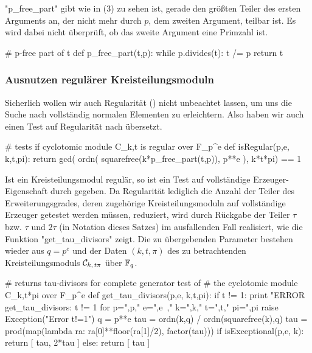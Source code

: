 "p_free_part" gibt wie in  (3) zu sehen ist,
gerade den größten Teiler des ersten Arguments an, der nicht mehr durch $p$,
dem zweiten Argument, teilbar ist. Es wird dabei nicht überprüft, ob das zweite
Argument eine Primzahl ist.


\begin{sagecode}[caption={Aus \url{../Sage/enumeratePCNs.spyx}}]
# p-free part of t
def p_free_part(t,p):
    while p.divides(t):
        t /= p
    return t
\end{sagecode}




\subsubsection{Ausnutzen regulärer Kreisteilungsmoduln}

Sicherlich wollen wir auch Regularität () nicht unbeachtet
lassen, um uns die Suche nach vollständig normalen Elementen zu erleichtern.
Also haben wir auch einen Test auf Regularität nach \sage übersetzt.

\begin{sagecode}[caption={Aus \url{../Sage/enumeratePCNs.spyx}}]
# tests if cyclotomic module C_k,t is regular over F_p^e
def isRegular(p,e, k,t,pi):
    return gcd( ordn( squarefree(k*p_free_part(t,p)), p**e ),  k*t*pi) == 1
\end{sagecode}

Ist ein Kreisteilungsmodul regulär, so ist ein Test auf vollständige
Erzeuger-Eigenschaft durch  gegeben.
Da Regularität lediglich die Anzahl der Teiler des Erweiterungsgrades, deren
zugehörige Kreisteilungsmoduln auf vollständige Erzeuger getestet werden
müssen, reduziert, wird  durch Rückgabe der
Teiler $\tau$ bzw. $\tau$ und $2\tau$ (in Notation dieses Satzes)
im ausfallenden Fall realisiert, wie die Funktion 
"get_tau_divisors" zeigt. Die zu übergebenden Parameter bestehen wieder aus 
$q = p^e$ und der Daten $(k,t,\pi)$ des zu betrachtenden Kreisteilungsmoduls 
$\mathcal{C}_{k,\,t\pi}$ über $\mathbb{F}_q$.

\begin{sagecode}[caption={Aus \url{../Sage/enumeratePCNs.spyx}}]
# returns tau-divisors for complete generator test of 
# the cyclotomic module C_k,t*pi over F_p^e
def get_tau_divisors(p,e, k,t,pi):
    if t != 1:
        print "ERROR get_tau_divisors: t != 1 for p=",p," e=",e\
                ," k=",k," t=",t," pi=",pi
        raise Exception("Error t!=1")
    q = p**e
    tau = ordn(k,q) / ordn(squarefree(k),q)
    tau = prod(map(lambda ra: ra[0]**floor(ra[1]/2), factor(tau)))
    if isExceptional(p,e, k):
        return [ tau, 2*tau ]
    else:
        return [ tau ]
\end{sagecode}


